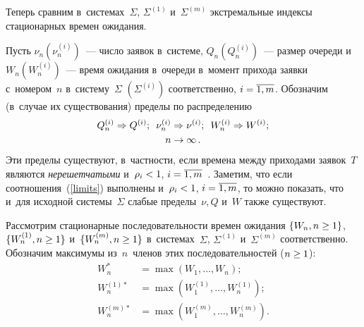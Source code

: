 \begin{multicols}{2}
  Теперь  сравним  в~системах~$\Sigma$,  $\Sigma^{(1)}$ и~$\Sigma^{(m)}$ 
экстремальные индексы стационарных времен ожидания.

Пусть   $\nu_n  (\nu_n^{(i)})$~--- число заявок в~сис\-те\-ме,   $Q_n ( Q_n^{(i)})$~---   
размер очереди и~$W_n (W_n^{(i)})$~---    время ожидания в~очереди в~момент прихода заявки с~номером~$n$ 
в~сис\-те\-му~$\Sigma$ $(\Sigma^{(i)})$ соответственно, $i\hm=\overline{1,m}$.
Обозначим (в~случае их существования) пределы по распределению
\begin{multline}
\label{limits}
Q_n^{(i)} \Rightarrow Q^{(i)};\enskip \nu_n^{(i)} \Rightarrow \nu^{(i)};\enskip
W_n^{(i)} \Rightarrow W^{(i)};\\
 n\to \infty\,.
\end{multline}
Эти  пределы существуют, в~частности,  если времена между приходами заявок~$T$  
являются \textit{нерешетчатыми}  и~$\rho_i\hm<1$,  $i\hm=\overline{1,m}$~\cite{Asmus}.  Заметим, что если соотношения~(\ref{limits}) 
выполнены и~$\rho_i\hm<1$, $i\hm=\overline{1,m}$, то можно показать, что и~для исходной сис\-те\-мы~$\Sigma$ 
слабые пределы~$\nu, Q$ и~$W$  также существуют.


Рассмотрим стационарные последовательности времен ожидания  $\{W_n, n\hm\ge 1 \}$, 
$\{W_n^{(1)}, n\hm\ge 1 \}$ и~$\{W_n^{(m)}, n\hm\ge 1 \}$
в~сис\-те\-мах~$\Sigma$, $\Sigma^{(1)}$ и~$\Sigma^{(m)}$ соответственно.
Обозначим максимумы из~$n$~членов этих последовательностей ($n\hm\ge 1$):
\begin{align*}
W_n^*&=\max\left(W_1,\dots, W_n\right);
\\
W_n^{(1)*}&=\max\left(W_1^{(1)},\dots, W_n^{(1)}\right);\\
W_n^{(m)*}&=\max\left(W_1^{(m)},\dots, W_n^{(m)}\right).
\end{align*}


\end{multicols}
